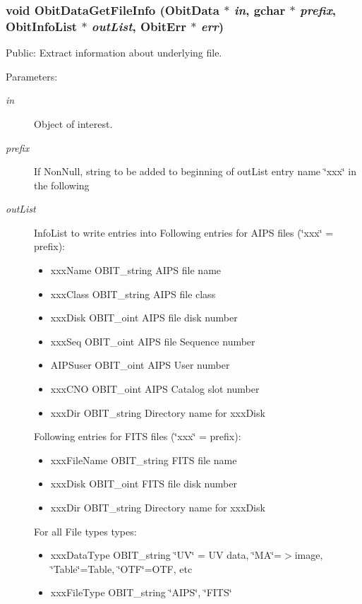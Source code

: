 \subsubsection{\setlength{\rightskip}{0pt plus 5cm}void Obit\-Data\-Get\-File\-Info ({\bf Obit\-Data} $\ast$ {\em in}, gchar $\ast$ {\em prefix}, {\bf Obit\-Info\-List} $\ast$ {\em out\-List}, {\bf Obit\-Err} $\ast$ {\em err})}\label{ObitData_8c_a29}


Public: Extract information about underlying file. 

\begin{Desc}
\item[Parameters:]
\begin{description}
\item[{\em in}]Object of interest. \item[{\em prefix}]If Non\-Null, string to be added to beginning of out\-List entry name \char`\"{}xxx\char`\"{} in the following \item[{\em out\-List}]Info\-List to write entries into Following entries for AIPS files (\char`\"{}xxx\char`\"{} = prefix): \begin{itemize}
\item xxx\-Name OBIT\_\-string AIPS file name \item xxx\-Class OBIT\_\-string AIPS file class \item xxx\-Disk OBIT\_\-oint AIPS file disk number \item xxx\-Seq OBIT\_\-oint AIPS file Sequence number \item AIPSuser OBIT\_\-oint AIPS User number \item xxx\-CNO OBIT\_\-oint AIPS Catalog slot number \item xxx\-Dir OBIT\_\-string Directory name for xxx\-Disk\end{itemize}
Following entries for FITS files (\char`\"{}xxx\char`\"{} = prefix): \begin{itemize}
\item xxx\-File\-Name OBIT\_\-string FITS file name \item xxx\-Disk OBIT\_\-oint FITS file disk number \item xxx\-Dir OBIT\_\-string Directory name for xxx\-Disk\end{itemize}
For all File types types: \begin{itemize}
\item xxx\-Data\-Type OBIT\_\-string \char`\"{}UV\char`\"{} = UV data, \char`\"{}MA\char`\"{}=$>$image, \char`\"{}Table\char`\"{}=Table, \char`\"{}OTF\char`\"{}=OTF, etc \item xxx\-File\-Type OBIT\_\-string \char`\"{}AIPS\char`\"{}, \char`\"{}FITS\char`\"{}\end{itemize}

\end{description}
\end{Desc}
